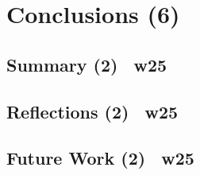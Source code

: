 \chapter{Conclusions (6)}
\label{ch:conclusions}

\section{Summary (2) ~w25}
\label{sec:summary}

\section{Reflections (2) ~w25}
\label{sec:reflections}

\section{Future Work (2) ~w25}
\label{sec:futureWork}
